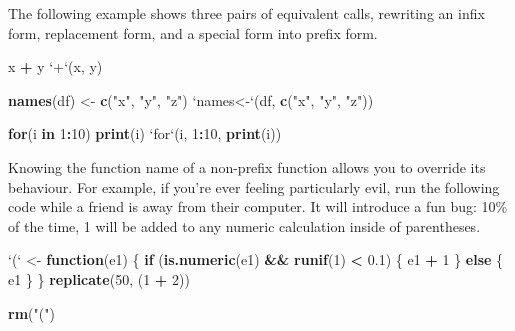\documentclass[]{book}
\newenvironment{Shaded}{\begin{snugshade}}{\end{snugshade}}
\newcommand{\KeywordTok}[1]{\textcolor[rgb]{0.13,0.29,0.53}{\textbf{#1}}}
\newcommand{\DataTypeTok}[1]{\textcolor[rgb]{0.13,0.29,0.53}{#1}}
\newcommand{\DecValTok}[1]{\textcolor[rgb]{0.00,0.00,0.81}{#1}}
\newcommand{\FloatTok}[1]{\textcolor[rgb]{0.00,0.00,0.81}{#1}}
\newcommand{\StringTok}[1]{\textcolor[rgb]{0.31,0.60,0.02}{#1}}
\newcommand{\ControlFlowTok}[1]{\textcolor[rgb]{0.13,0.29,0.53}{\textbf{#1}}}
\newcommand{\OperatorTok}[1]{\textcolor[rgb]{0.81,0.36,0.00}{\textbf{#1}}}
\newcommand{\NormalTok}[1]{#1}
\theoremstyle{definition}
\theoremstyle{definition}
\theoremstyle{definition}
\theoremstyle{remark}
\begin{document}
The following example shows three pairs of equivalent calls, rewriting
an infix form, replacement form, and a special form into prefix form.

\begin{Shaded}
\begin{Highlighting}[]
\NormalTok{x }\OperatorTok{+}\StringTok{ }\NormalTok{y}
\StringTok{`}\DataTypeTok{+}\StringTok{`}\NormalTok{(x, y)}

\KeywordTok{names}\NormalTok{(df) <-}\StringTok{ }\KeywordTok{c}\NormalTok{(}\StringTok{"x"}\NormalTok{, }\StringTok{"y"}\NormalTok{, }\StringTok{"z"}\NormalTok{)}
\StringTok{`}\DataTypeTok{names<-}\StringTok{`}\NormalTok{(df, }\KeywordTok{c}\NormalTok{(}\StringTok{"x"}\NormalTok{, }\StringTok{"y"}\NormalTok{, }\StringTok{"z"}\NormalTok{))}

\ControlFlowTok{for}\NormalTok{(i }\ControlFlowTok{in} \DecValTok{1}\OperatorTok{:}\DecValTok{10}\NormalTok{) }\KeywordTok{print}\NormalTok{(i)}
\StringTok{`}\DataTypeTok{for}\StringTok{`}\NormalTok{(i, }\DecValTok{1}\OperatorTok{:}\DecValTok{10}\NormalTok{, }\KeywordTok{print}\NormalTok{(i))}
\end{Highlighting}
\end{Shaded}

Knowing the function name of a non-prefix function allows you to
override its behaviour. For example, if you're ever feeling particularly
evil, run the following code while a friend is away from their computer.
It will introduce a fun bug: 10\% of the time, 1 will be added to any
numeric calculation inside of parentheses.

\begin{Shaded}
\begin{Highlighting}[]
\StringTok{`}\DataTypeTok{(}\StringTok{`}\NormalTok{ <-}\StringTok{ }\ControlFlowTok{function}\NormalTok{(e1) \{}
  \ControlFlowTok{if}\NormalTok{ (}\KeywordTok{is.numeric}\NormalTok{(e1) }\OperatorTok{&&}\StringTok{ }\KeywordTok{runif}\NormalTok{(}\DecValTok{1}\NormalTok{) }\OperatorTok{<}\StringTok{ }\FloatTok{0.1}\NormalTok{) \{}
\NormalTok{    e1 }\OperatorTok{+}\StringTok{ }\DecValTok{1}
\NormalTok{  \} }\ControlFlowTok{else}\NormalTok{ \{}
\NormalTok{    e1}
\NormalTok{  \}}
\NormalTok{\}}
\KeywordTok{replicate}\NormalTok{(}\DecValTok{50}\NormalTok{, (}\DecValTok{1} \OperatorTok{+}\StringTok{ }\DecValTok{2}\NormalTok{))}
\end{Highlighting}
\end{Shaded}

\begin{Shaded}
\begin{Highlighting}[]
\KeywordTok{rm}\NormalTok{(}\StringTok{"("}\NormalTok{)}
\end{Highlighting}
\end{Shaded}
\end{document}
